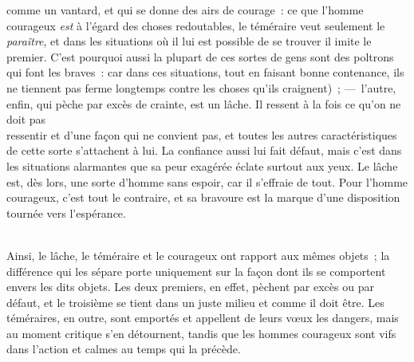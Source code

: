 \documentclass[french,twoside]{book} %
\begin{document}
comme un vantard, et qui se donne des airs de courage : ce que l’homme courageux {\itshape est} à l’égard des choses redoutables, le téméraire veut seulement le {\itshape paraître}, et dans les situations où il lui est possible de se trouver il imite le premier. C’est pourquoi aussi la plupart de ces sortes de gens sont des poltrons qui font les braves : car dans ces situations, tout en faisant bonne contenance, ils ne tiennent pas ferme longtemps contre les choses qu’ils craignent) ; — l’autre, enfin, qui pèche par excès de crainte, est un lâche. Il ressent à la fois ce qu’on ne doit pas \\
ressentir et d’une façon qui ne convient pas, et toutes les autres caractéristiques de cette sorte s’attachent à lui. La confiance  aussi lui fait défaut, mais c’est dans les situations alarmantes que sa peur exagérée éclate surtout aux yeux. Le lâche est, dès lors, une sorte d’homme sans espoir, car il s’effraie de tout. Pour l’homme courageux, c’est tout le contraire, et sa bravoure est la marque d’une disposition tournée vers l’espérance.\par
\\
Ainsi, le lâche, le téméraire et le courageux ont rapport aux mêmes objets ; la différence qui les sépare porte uniquement sur la façon dont ils se comportent envers les dits objets. Les deux premiers, en effet, pèchent par excès ou par défaut, et le troisième se tient dans un juste milieu et comme il doit être. Les téméraires, en outre, sont emportés et appellent de leurs vœux les dangers, mais au moment critique s’en détournent, tandis que les hommes courageux sont vifs dans l’action et calmes au temps qui la précède.
\end{document}
